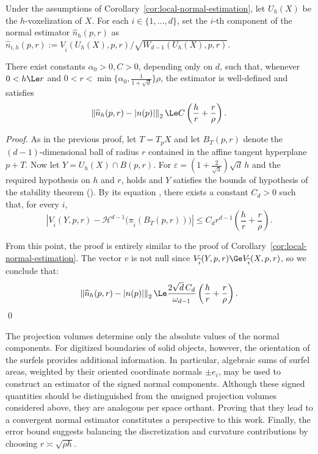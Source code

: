 \begin{corollary}%
\label{cor:cubical-normal-estimation}
Under the assumptions of Corollary~\ref{cor:local-normal-estimation},
let $U_h(X)$ be the $h$-voxelization of $X$.  For each
$i\in\{1,\ldots,d\}$, set the $i$-th component of the normal estimator
$\widehat{n}_{h}(p,r)$ as $\widehat{n}_{i,h}(p,r):=
V_{\widehat{i}}(U_h(X),p,r)/\sqrt{W_{d-1}(U_h(X),p,r)}$.
 

There exist constants $\alpha_0>0,C>0$, depending only on $d$, such
that, whenever $0 < h \Le r$ and $0 < r < \min \{ \alpha_0,
\frac{1}{1+\sqrt{d}} \} \rho$, the estimator is well-defined and
satisfies
\[
\left\|\widehat{n}_h(p,r)-|n(p)|\right\|_2
\Le C \left(\frac{h}{r}+\frac{r}{\rho} \right).
\]
\end{corollary}

\begin{proof}
  As in the previous proof, let $T=T_pX$ and let $B_T(p,r)$ denote the
  $(d-1)$-dimensional ball of radius $r$
  contained in the affine tangent hyperplane
  $p+T$. Now let $Y=U_h(X) \cap B(p,r)$. For $\varepsilon=\left(1+\frac{2}{\sqrt3}\right)\sqrt d\,h$ and the required hypothesis on $h$ and $r$,  holds and $Y$ satisfies the bounds of hypothesis  of the stability theorem (). 
  By its equation , there exists a
constant $C_d>0$ such that, for every $i$,
\[
\left|
V_{\widehat{i}}(Y,p,r)
- \mathcal H^{d-1}
\bigl(\pi_{\widehat i}(B_T(p,r))\bigr)
\right|
\le
C_d r^{d-1}\left(\frac{h}{r}+\frac{r}{\rho}\right).
\]

From this point, the proof is entirely similar to the proof of Corollary~\ref{cor:local-normal-estimation}. The vector $v$ is not null since $V_{\widehat{i}}(Y,p,r) \Ge V_{\widehat{i}}(X,p,r)$, so we conclude that:
\[
\left\|\widehat n_h(p,r)-|n(p)|\right\|_2
\Le \frac{2\sqrt d\,C_d}{\omega_{d-1}}
\left(\frac{h}{r}+\frac{r}{\rho}\right).
\]
\qed
\end{proof}


\begin{remark}
The projection volumes determine only the absolute values
of the normal components.
%
For digitized boundaries of solid objects, however, the orientation of
the surfels provides additional information.  In particular, algebraic
sums of surfel areas, weighted by their oriented coordinate normals
$\pm e_i$, may be used to construct an estimator of the signed normal
components. Although these signed quantities should be distinguished
from the unsigned projection volumes considered above, they are
analogous per space orthant. Proving that they lead to a convergent
normal estimator constitutes a perspective to this work.
%
Finally, the error bound suggests balancing the discretization
and curvature contributions by choosing
$r\asymp\sqrt{\rho h}$.
\end{remark}


